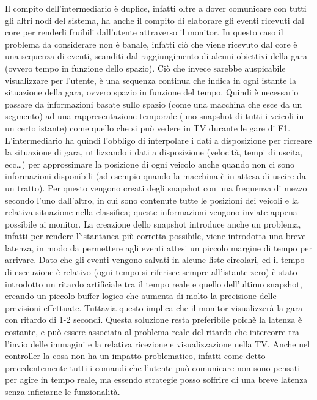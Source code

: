 Il compito dell’intermediario è duplice, infatti oltre a dover comunicare con tutti gli altri nodi del sistema, ha anche il compito di elaborare gli eventi ricevuti dal core per renderli fruibili dall’utente attraverso il monitor.
In questo caso il problema da considerare non è banale, infatti ciò che viene ricevuto dal core è una sequenza di eventi, scanditi dal raggiungimento di alcuni obiettivi della gara (ovvero tempo in funzione dello spazio). Ciò che invece sarebbe auspicabile visualizzare per l’utente, è una sequenza continua che indica in ogni istante la situazione della gara, ovvero spazio in funzione del tempo. Quindi è necessario passare da informazioni basate sullo spazio (come una macchina che esce da un segmento) ad una rappresentazione temporale (uno snapshot di tutti i veicoli in un certo istante) come quello che si può vedere in TV durante le gare di F1.
L’intermediario ha quindi l’obbligo di interpolare i dati a disposizione per ricreare la situazione di gara, utilizzando i dati a disposizione (velocità, tempi di uscita, ecc…) per approssimare la posizione di ogni veicolo anche quando non ci sono informazioni disponibili (ad esempio quando la macchina è in attesa di uscire da un tratto).
Per questo vengono creati degli snapshot con una frequenza di mezzo secondo l’uno dall’altro, in cui sono contenute tutte le posizioni dei veicoli e la relativa situazione nella classifica; queste informazioni vengono inviate appena possibile ai monitor.
La creazione dello snapshot introduce anche un problema, infatti per rendere l’istantanea più corretta possibile, viene introdotta una breve latenza, in modo da permettere agli eventi attesi un piccolo margine di tempo per arrivare. Dato che gli eventi vengono salvati in alcune liste circolari, ed il tempo di esecuzione è relativo (ogni tempo si riferisce sempre all’istante zero) è stato introdotto un ritardo artificiale tra il tempo reale e quello dell’ultimo snapshot, creando un piccolo buffer logico che aumenta di molto la precisione delle previsioni effettuate. Tuttavia questo implica che il monitor visualizzerà la gara con ritardo di 1-2 secondi. Questa soluzione resta preferibile poichè la latenza è costante, e può essere associata al problema reale del ritardo che intercorre tra l’invio delle immagini e la relativa ricezione e visualizzazione nella TV. Anche nel controller la cosa non ha un impatto problematico, infatti come detto precedentemente tutti i comandi che l’utente può comunicare non sono pensati per agire in tempo reale, ma essendo strategie posso soffrire di una breve latenza senza inficiarne le funzionalità.

